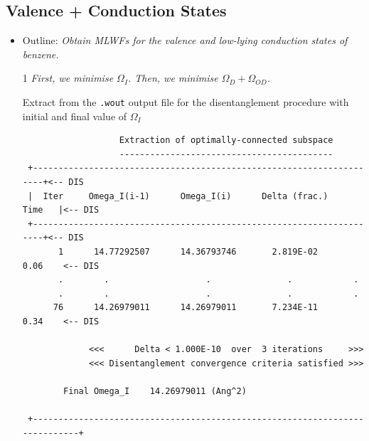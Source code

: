 \subsection*{Valence + Conduction States}
\begin{itemize}
\item Outline: {\it Obtain MLWFs for the valence and low-lying conduction states of benzene.}
\end{itemize}

\begin{itemize}
\item[1] {\it First, we minimise $\Omega_I$. Then, we minimise $\Omega_D + \Omega_{OD}$.}

Extract from the {\tt .wout} output file for the disentanglement procedure with initial and final value of $\Omega_I$
  \begin{tcolorbox}[floatplacement=h!,float,nobeforeafter,sharp corners,boxrule=0.5pt]
  {\small
\begin{verbatim}
                   Extraction of optimally-connected subspace
                   ------------------------------------------
 +---------------------------------------------------------------------+<-- DIS
 |  Iter     Omega_I(i-1)      Omega_I(i)      Delta (frac.)    Time   |<-- DIS
 +---------------------------------------------------------------------+<-- DIS
       1      14.77292507      14.36793746       2.819E-02      0.06    <-- DIS
       .		.					.				.			 .
       .		.					.				.			 .
      76      14.26979011      14.26979011       7.234E-11      0.34    <-- DIS

             <<<      Delta < 1.000E-10  over  3 iterations     >>>
             <<< Disentanglement convergence criteria satisfied >>>

        Final Omega_I    14.26979011 (Ang^2)

 +----------------------------------------------------------------------------+		
\end{verbatim}
}
\end{tcolorbox}


\end{itemize}
